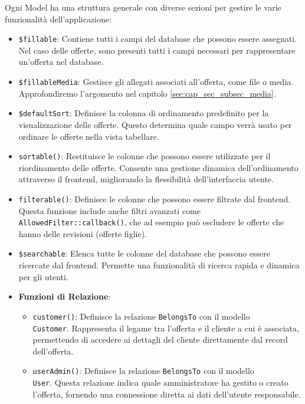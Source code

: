 \break
Ogni Model ha una struttura generale con diverse sezioni per gestire le varie funzionalità dell'applicazione:\begin{itemize}
    \item \texttt{\$fillable}: Contiene tutti i campi del database che possono essere assegnati. Nel caso delle offerte, sono presenti tutti i campi necessari per rappresentare un'offerta nel database.
    
    \item \texttt{\$fillableMedia}: Gestisce gli allegati associati all'offerta, come file o media. Approfondiremo l'argomento nel capitolo \ref{sec:cap_sec_subsec_media}.

    \item \texttt{\$defaultSort}: Definisce la colonna di ordinamento predefinito per la visualizzazione delle offerte. Questo determina quale campo verrà usato per ordinare le offerte nella vista tabellare.

    \item \texttt{sortable()}: Restituisce le colonne che possono essere utilizzate per il riordinamento delle offerte. Consente una gestione dinamica dell'ordinamento attraverso il frontend, migliorando la flessibilità dell'interfaccia utente.

    \item \texttt{filterable()}: Definisce le colonne che possono essere filtrate dal frontend. Questa funzione include anche filtri avanzati come\\
    \texttt{AllowedFilter::callback()}, che ad esempio può escludere le offerte che hanno delle revisioni (offerte figlie).

    \item \texttt{\$searchable}: Elenca tutte le colonne del database che possono essere ricercate dal frontend. Permette una funzionalità di ricerca rapida e dinamica per gli utenti.

    \item \textbf{Funzioni di Relazione}:
    \begin{itemize}
        \item \texttt{customer()}: Definisce la relazione \texttt{BelongsTo} con il modello\\
        \texttt{Customer}. Rappresenta il legame tra l'offerta e il cliente a cui è associata, permettendo di accedere ai dettagli del cliente direttamente dal record dell'offerta.
        
        \item \texttt{userAdmin()}: Definisce la relazione \texttt{BelongsTo} con il modello\\
        \texttt{User}. Questa relazione indica quale amministratore ha gestito o creato l'offerta, fornendo una connessione diretta ai dati dell'utente responsabile.
    

\end{itemize}
\end{itemize}
